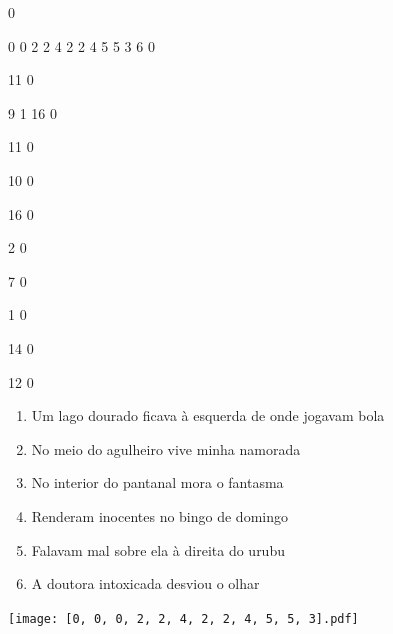 \documentclass[12pt]{article}
\begin{document}
		\vfill  
		  
{
	0	%

	0	%
	0	%
	2	%
	2	%
	4	%
	2	%
	2	%
	4	%
	5	%
	5	%
	3	%
	6	%
	0	%

	11	%
	0	%

	9	%
	1	%
	16	%
	0	%

	11	%
	0	%

	10	%
	0	%

	16	%
	0	%

	2	%
	0	%

	7	%
	0	%

	1	%
	0	%

	14	%
	0	%

	12	%
	0	%

}	  
		    	

		 

\pagebreak


	\begin{enumerate}
		  \sffamily %
		  \large %


\vfill \item
Um lago dourado ficava	%
à esquerda
de onde jogavam bola	%

\vfill \item
No meio do agulheiro	%
vive minha namorada	%

\vfill \item
No interior do pantanal	%
mora o fantasma	%

\vfill \item
Renderam inocentes	%
no bingo de domingo	%

\vfill \item
Falavam mal sobre ela	%
à direita
do urubu	%

\vfill \item
A doutora intoxicada	%
desviou o olhar	%
	\end{enumerate}
		  
		  \hfill

		  \vfill

\texttt{[image: [0, 0, 0, 2, 2, 4, 2, 2, 4, 5, 5, 3].pdf]}


	\hfill	  	  

\end{document}
